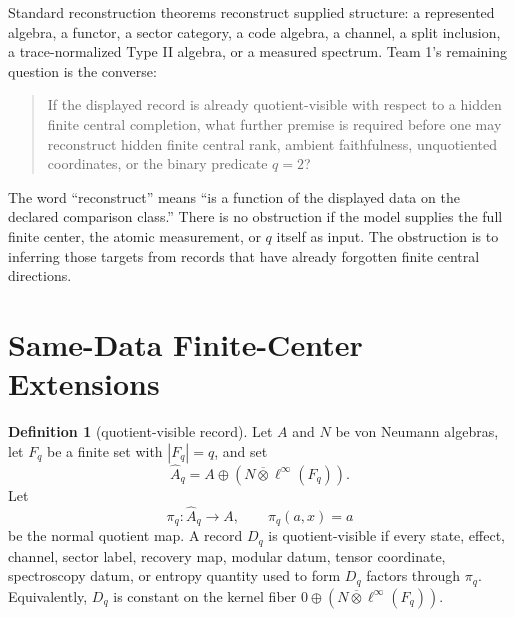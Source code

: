 \documentclass[12pt]{article}
\theoremstyle{definition}
\newtheorem{definition}{Definition}
\theoremstyle{remark}
\begin{document}
Standard reconstruction theorems reconstruct supplied structure: a represented
algebra, a functor, a sector category, a code algebra, a channel, a split
inclusion, a trace-normalized Type II algebra, or a measured spectrum.  Team 1's
remaining question is the converse:

\begin{quote}
If the displayed record is already quotient-visible with respect to a hidden
finite central completion, what further premise is required before one may
reconstruct hidden finite central rank, ambient faithfulness, unquotiented
coordinates, or the binary predicate \(q=2\)?
\end{quote}

The word ``reconstruct'' means ``is a function of the displayed data on the
declared comparison class.''  There is no obstruction if the model supplies the
full finite center, the atomic measurement, or \(q\) itself as input.  The
obstruction is to inferring those targets from records that have already
forgotten finite central directions.

\section{Same-Data Finite-Center Extensions}

\begin{definition}[quotient-visible record]
Let \(A\) and \(N\) be von Neumann algebras, let \(F_q\) be a finite set with
\(|F_q|=q\), and set
\[
  \widehat A_q=A\oplus \left(N\overline\otimes \ell^\infty(F_q)\right).
\]
Let
\[
  \pi_q:\widehat A_q\to A,\qquad
  \pi_q(a,x)=a
\]
be the normal quotient map.  A record \(D_q\) is quotient-visible if every
state, effect, channel, sector label, recovery map, modular datum, tensor
coordinate, spectroscopy datum, or entropy quantity used to form \(D_q\)
factors through \(\pi_q\).  Equivalently, \(D_q\) is constant on the kernel
fiber \(0\oplus (N\overline\otimes \ell^\infty(F_q))\).
\end{definition}
\end{document}
